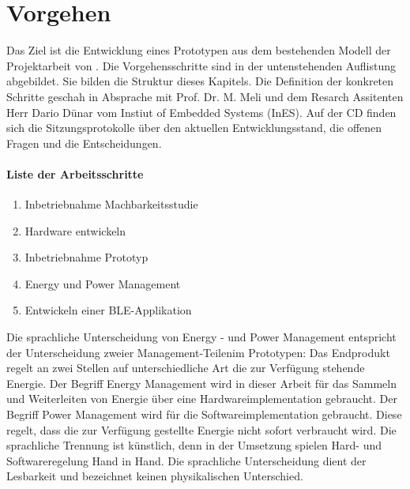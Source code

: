 \chapter{Vorgehen}
\label{ch_vorgehen} 

Das Ziel ist die Entwicklung eines Prototypen aus dem bestehenden Modell der Projektarbeit von \cite{PA_bicycle}. Die Vorgehensschritte sind in der untenstehenden Auflistung abgebildet. Sie bilden die Struktur dieses Kapitels. Die Definition der konkreten Schritte geschah in Absprache mit Prof. Dr. M. Meli und dem Resarch Assitenten Herr Dario Dünar vom Instiut of Embedded Systems (InES). Auf der CD finden sich die Sitzungsprotokolle über den aktuellen Entwicklungsstand, die offenen Fragen und die Entscheidungen.

\subsubsection*{Liste der Arbeitsschritte}
\label{liste} 

\begin{enumerate}
  \item Inbetriebnahme Machbarkeitsstudie  
  \item Hardware entwickeln  
  \item Inbetriebnahme Prototyp      
  \item Energy und Power Management
  \item Entwickeln einer BLE-Applikation       
 \end{enumerate}  

Die sprachliche Unterscheidung von Energy - und Power Management entspricht der Unterscheidung zweier \glqq Management-Teilen\grqq\medskip im Prototypen: Das Endprodukt regelt an zwei Stellen auf unterschiedliche Art die zur Verfügung stehende Energie. Der Begriff Energy Management wird in dieser Arbeit für das Sammeln und Weiterleiten von Energie über eine Hardwareimplementation gebraucht. Der Begriff Power Management wird für die Softwareimplementation gebraucht. Diese regelt, dass die zur Verfügung gestellte Energie nicht sofort verbraucht wird. Die sprachliche Trennung ist künstlich, denn in der Umsetzung spielen Hard- und Softwareregelung Hand in Hand. Die sprachliche Unterscheidung dient der Lesbarkeit und bezeichnet keinen physikalischen Unterschied.
 
 
  
